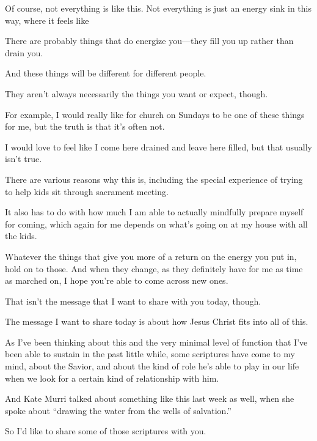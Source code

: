 \begin{compactitem}
			\item Of course, not everything is like this. Not everything is just an energy sink in this way, where it feels like 
				\begin{compactitem}
					\item There are probably things that do energize you---they fill you up rather than drain you.
					\item And these things will be different for different people.
					\item They aren't always necessarily the things you want or expect, though.
					\item For example, I would really like for church on Sundays to be one of these things for me, but the truth is that it's often not.
					\item I would love to feel like I come here drained and leave here filled, but that usually isn't true.
					\item There are various reasons why this is, including the special experience of trying to help kids sit through sacrament meeting.
					\item It also has to do with how much I am able to actually mindfully prepare myself for coming, which again for me depends on what's going on at my house with all the kids.
					\item Whatever the things that give you more of a return on the energy you put in, hold on to those. And when they change, as they definitely have for me as time as marched on, I hope you're able to come across new ones.
				\end{compactitem}
				
			\item That isn't the message that I want to share with you today, though.
				\begin{compactitem}
					\item The message I want to share today is about how Jesus Christ fits into all of this.
					\item As I've been thinking about this and the very minimal level of function that I've been able to sustain in the past little while, some scriptures have come to my mind, about the Savior, and about the kind of role he's able to play in our life when we look for a certain kind of relationship with him.
					\item And Kate Murri talked about something like this last week as well, when she spoke about ``drawing the water from the wells of salvation.''
					\item So I'd like to share some of those scriptures with you. 
				\end{compactitem} 
				

\end{compactitem}
